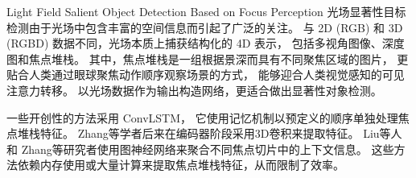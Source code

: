 %
%
%
%
%
%
%
%




{Light Field Salient Object Detection Based on Focus Perception}
\label{chap:part3}
%
%
光场显著性目标检测由于光场中包含丰富的空间信息而引起了广泛的关注。
与 2D (RGB) 和 3D (RGBD) 数据不同，光场本质上捕获结构化的 4D 表示，
包括多视角图像、深度图和焦点堆栈。 
其中，焦点堆栈是一组根据景深而具有不同聚焦区域的图片，
更贴合人类通过眼球聚焦动作顺序观察场景的方式，
能够迎合人类视觉感知的可见注意力转移。
以光场数据作为输出构造网络，更适合做出显著性对象检测。







一些开创性的方法采用 ConvLSTM，
它使用记忆机制以预定义的顺序单独处理焦点堆栈特征。
Zhang等学者后来在编码器阶段采用3D卷积来提取特征。
Liu等人和
Zhang等研究者使用图神经网络来聚合不同焦点切片中的上下文信息。 
这些方法依赖内存使用或大量计算来提取焦点堆栈特征，从而限制了效率。




